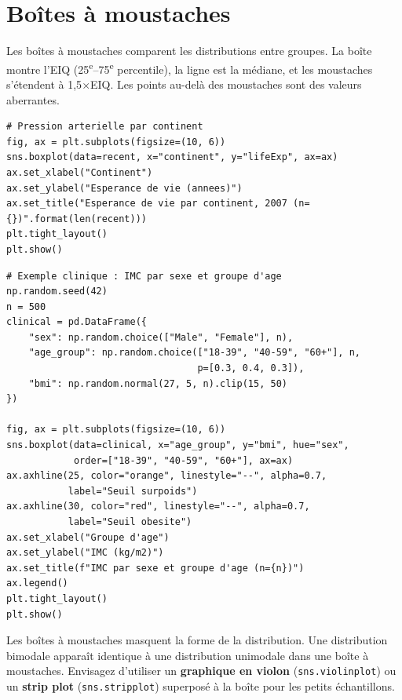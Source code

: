 \section{Bo\^ites \`a moustaches}

Les bo\^ites \`a moustaches comparent les distributions entre groupes. La bo\^ite montre l'EIQ (25\textsuperscript{e}--75\textsuperscript{e} percentile), la ligne est la m\'ediane, et les moustaches s'\'etendent \`a 1,5$\times$EIQ. Les points au-del\`a des moustaches sont des valeurs aberrantes.

\begin{verbatim}
# Pression arterielle par continent
fig, ax = plt.subplots(figsize=(10, 6))
sns.boxplot(data=recent, x="continent", y="lifeExp", ax=ax)
ax.set_xlabel("Continent")
ax.set_ylabel("Esperance de vie (annees)")
ax.set_title("Esperance de vie par continent, 2007 (n={})".format(len(recent)))
plt.tight_layout()
plt.show()
\end{verbatim}

\begin{verbatim}
# Exemple clinique : IMC par sexe et groupe d'age
np.random.seed(42)
n = 500
clinical = pd.DataFrame({
    "sex": np.random.choice(["Male", "Female"], n),
    "age_group": np.random.choice(["18-39", "40-59", "60+"], n,
                                  p=[0.3, 0.4, 0.3]),
    "bmi": np.random.normal(27, 5, n).clip(15, 50)
})

fig, ax = plt.subplots(figsize=(10, 6))
sns.boxplot(data=clinical, x="age_group", y="bmi", hue="sex",
            order=["18-39", "40-59", "60+"], ax=ax)
ax.axhline(25, color="orange", linestyle="--", alpha=0.7,
           label="Seuil surpoids")
ax.axhline(30, color="red", linestyle="--", alpha=0.7,
           label="Seuil obesite")
ax.set_xlabel("Groupe d'age")
ax.set_ylabel("IMC (kg/m2)")
ax.set_title(f"IMC par sexe et groupe d'age (n={n})")
ax.legend()
plt.tight_layout()
plt.show()
\end{verbatim}

\begin{warningbox}
Les bo\^ites \`a moustaches masquent la forme de la distribution. Une distribution bimodale appara\^it identique \`a une distribution unimodale dans une bo\^ite \`a moustaches. Envisagez d'utiliser un \textbf{graphique en violon} (\texttt{sns.violinplot}) ou un \textbf{strip plot} (\texttt{sns.stripplot}) superpos\'e \`a la bo\^ite pour les petits \'echantillons.
\end{warningbox}

